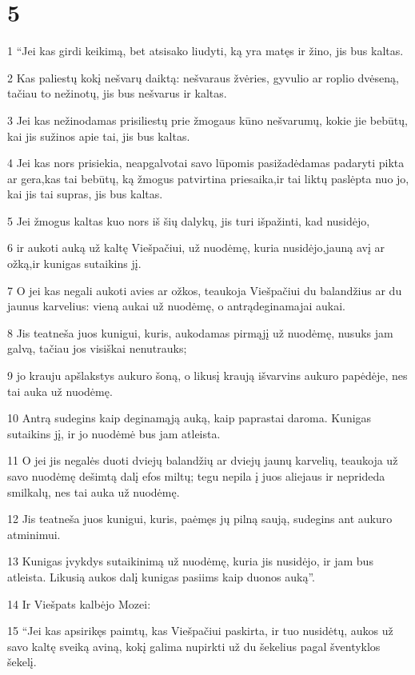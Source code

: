 \chapter{5}

\par 1 “Jei kas girdi keikimą, bet atsisako liudyti, ką yra matęs ir žino, jis bus kaltas. 
\par 2 Kas paliestų kokį nešvarų daiktą: nešvaraus žvėries, gyvulio ar roplio dvėseną, tačiau to nežinotų, jis bus nešvarus ir kaltas. 
\par 3 Jei kas nežinodamas prisiliestų prie žmogaus kūno nešvarumų, kokie jie bebūtų, kai jis sužinos apie tai, jis bus kaltas. 
\par 4 Jei kas nors prisiekia, neapgalvotai savo lūpomis pasižadėdamas padaryti pikta ar gera,­kas tai bebūtų, ką žmogus patvirtina priesaika,­ir tai liktų paslėpta nuo jo, kai jis tai supras, jis bus kaltas. 
\par 5 Jei žmogus kaltas kuo nors iš šių dalykų, jis turi išpažinti, kad nusidėjo, 
\par 6 ir aukoti auką už kaltę Viešpačiui, už nuodėmę, kuria nusidėjo,­jauną avį ar ožką,­ir kunigas sutaikins jį. 
\par 7 O jei kas negali aukoti avies ar ožkos, teaukoja Viešpačiui du balandžius ar du jaunus karvelius: vieną aukai už nuodėmę, o antrą­deginamajai aukai. 
\par 8 Jis teatneša juos kunigui, kuris, aukodamas pirmąjį už nuodėmę, nusuks jam galvą, tačiau jos visiškai nenutrauks; 
\par 9 jo krauju apšlakstys aukuro šoną, o likusį kraują išvarvins aukuro papėdėje, nes tai auka už nuodėmę. 
\par 10 Antrą sudegins kaip deginamąją auką, kaip paprastai daroma. Kunigas sutaikins jį, ir jo nuodėmė bus jam atleista. 
\par 11 O jei jis negalės duoti dviejų balandžių ar dviejų jaunų karvelių, teaukoja už savo nuodėmę dešimtą dalį efos miltų; tegu nepila į juos aliejaus ir neprideda smilkalų, nes tai auka už nuodėmę. 
\par 12 Jis teatneša juos kunigui, kuris, paėmęs jų pilną saują, sudegins ant aukuro atminimui. 
\par 13 Kunigas įvykdys sutaikinimą už nuodėmę, kuria jis nusidėjo, ir jam bus atleista. Likusią aukos dalį kunigas pasiims kaip duonos auką”. 
\par 14 Ir Viešpats kalbėjo Mozei: 
\par 15 “Jei kas apsirikęs paimtų, kas Viešpačiui paskirta, ir tuo nusidėtų, aukos už savo kaltę sveiką aviną, kokį galima nupirkti už du šekelius pagal šventyklos šekelį. 
